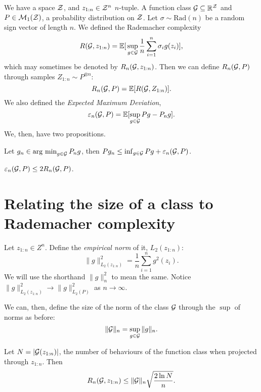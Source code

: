 \documentclass[twoside]{article}
\newcommand{\zn}{z_{1:n}}
\newcommand{\Rad}{\mathrm{Rad}}
\newcommand{\supg}{\sup_{g \in \cG}}
\begin{document}
We have a space $\mathcal{Z}$, and $\zn \in \cZ^n$ $n$-tuple. A function class $\mathcal{G} \subseteq \mathbb{R}^{\mathcal{Z}}$ and $P \in \mathcal{M}_1(\mathcal{Z})$, a probability distribution on $\mathcal{Z}$. Let $\sigma \sim \Rad(n)$ be a random sign vector of length $n$.
We defined the Rademacher complexity 
$$R(\cG, \zn) = \E [  \, \supg \frac1n \sum_{i=1}^n \sigma_i g(z_i) ] ,$$
which may sometimes be denoted by $R_n(\cG, \zn)$.
Then we can define $R_n(\mathcal{G}, P)$ through samples $Z_{1:n} \sim P^{\otimes n}$:
$$R_n(\mathcal{G}, P) = \mathbb{E} [  R(\mathcal{G}, Z_{1:n}) ].$$
We also defined the \textit{Expected Maximum Deviation}, $$\varepsilon_n(\mathcal{G}, P) = \mathbb{E}[\sup_{g \in \mathcal{G}} Pg - P_n g].$$
We, then, have two propositions.

\begin{proposition}
    Let $g_n \in \operatorname*{arg\ min}_{g \in \mathcal{G}} P_n g$, then $P g_n \leq \inf_{g \in \mathcal{G}} Pg + \varepsilon_n(\mathcal{G}, P)$.
\end{proposition}

\begin{proposition} \label{prop:16_emd_rademacher}
    $\varepsilon_n(\mathcal{G}, P) \leq 2  R_n(\mathcal{G}, P)$.
\end{proposition}

\section{Relating the size of a class to Rademacher complexity}

\begin{definition}    
    Let $\zn \in Z^n$. Define the \textit{empirical norm} of it, $L_2(\zn)$:
    \begin{equation*}
        \| g \|^2_{L_2(\zn)} = \frac1n \sum_{i=1}^n g^2(z_i).        
    \end{equation*}
    We will use the shorthand $ \| g \|^2_n$ to mean the same. Notice $ \| g \|^2_{L_2(\zn)} \to \| g \|^2_{L_2(P)} $ as $n \to \infty$.
\end{definition}

\begin{definition}
    We can, then, define the size of the norm of the class $\mathcal{G}$ through the $\sup$ of norms as before:
    \begin{equation*}
        \| \cG \|_{n} = \supg \| g \|_n.        
    \end{equation*}
\end{definition}

\begin{proposition} \label{prop:rad_upper_bound}
    Let $N = | \cG(\zn) |$, the number of behaviours of the function class when projected through $\zn$. Then
    \begin{equation*}
        R_n(\cG, \zn) \leq \| \cG \|_{n} \sqrt{ \frac {2 \ln N} {n} }.
    \end{equation*}
\end{proposition}
\end{document}
